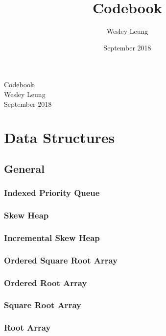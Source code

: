 \documentclass[8pt]{article}
\title{Codebook}
\author{Wesley Leung}
\date{September 2018}
\begin{document}
\begin{titlepage}
\vspace*{\fill}
\begin{center}
    {\Huge Codebook}\\[0.7cm]
    {\Large Wesley Leung}\\[0.5cm]
    September 2018
\end{center}
\vspace*{\fill}
\end{titlepage}

\tableofcontents
\newpage

\section{Data Structures}
\subsection{General}
\subsubsection{Indexed Priority Queue}

\subsubsection{Skew Heap}

\subsubsection{Incremental Skew Heap}

\subsubsection{Ordered Square Root Array}

\subsubsection{Ordered Root Array}

\subsubsection{Square Root Array}

\subsubsection{Root Array}

\end{document}
